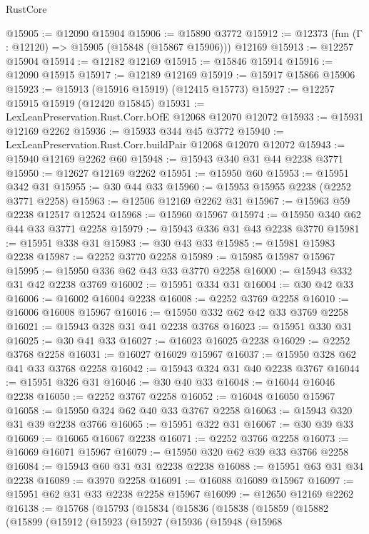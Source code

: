 \begin{lexlean}{RustCore}
\begin{coremodule}
@15905 := @12090 @15904
@15906 := @15890 @3772
@15912 := @12373 (fun (Γ : @12120) => @15905 (@15848 (@15867 @15906))) @12169
@15913 := @12257 @15904
@15914 := @12182 @12169
@15915 := @15846 @15914
@15916 := @12090 @15915
@15917 := @12189 @12169
@15919 := @15917 @15866 @15906
@15923 := @15913 (@15916 @15919) (@12415 @15773)
@15927 := @12257 @15915 @15919 (@12420 @15845)
@15931 := LexLeanPreservation.Rust.Corr.bOfE @12068 @12070 @12072
@15933 := @15931 @12169 @2262
@15936 := @15933 @344 @45 @3772
@15940 := LexLeanPreservation.Rust.Corr.buildPair @12068 @12070 @12072
@15943 := @15940 @12169 @2262 @60
@15948 := @15943 @340 @31 @44 @2238 @3771
@15950 := @12627 @12169 @2262
@15951 := @15950 @60
@15953 := @15951 @342 @31
@15955 := @30 @44 @33
@15960 := @15953 @15955 @2238 (@2252 @3771 @2258)
@15963 := @12506 @12169 @2262 @31
@15967 := @15963 @59 @2238 @12517 @12524
@15968 := @15960 @15967
@15974 := @15950 @340 @62 @44 @33 @3771 @2258
@15979 := @15943 @336 @31 @43 @2238 @3770
@15981 := @15951 @338 @31
@15983 := @30 @43 @33
@15985 := @15981 @15983 @2238
@15987 := @2252 @3770 @2258
@15989 := @15985 @15987 @15967
@15995 := @15950 @336 @62 @43 @33 @3770 @2258
@16000 := @15943 @332 @31 @42 @2238 @3769
@16002 := @15951 @334 @31
@16004 := @30 @42 @33
@16006 := @16002 @16004 @2238
@16008 := @2252 @3769 @2258
@16010 := @16006 @16008 @15967
@16016 := @15950 @332 @62 @42 @33 @3769 @2258
@16021 := @15943 @328 @31 @41 @2238 @3768
@16023 := @15951 @330 @31
@16025 := @30 @41 @33
@16027 := @16023 @16025 @2238
@16029 := @2252 @3768 @2258
@16031 := @16027 @16029 @15967
@16037 := @15950 @328 @62 @41 @33 @3768 @2258
@16042 := @15943 @324 @31 @40 @2238 @3767
@16044 := @15951 @326 @31
@16046 := @30 @40 @33
@16048 := @16044 @16046 @2238
@16050 := @2252 @3767 @2258
@16052 := @16048 @16050 @15967
@16058 := @15950 @324 @62 @40 @33 @3767 @2258
@16063 := @15943 @320 @31 @39 @2238 @3766
@16065 := @15951 @322 @31
@16067 := @30 @39 @33
@16069 := @16065 @16067 @2238
@16071 := @2252 @3766 @2258
@16073 := @16069 @16071 @15967
@16079 := @15950 @320 @62 @39 @33 @3766 @2258
@16084 := @15943 @60 @31 @31 @2238 @2238
@16088 := @15951 @63 @31 @34 @2238
@16089 := @3970 @2258
@16091 := @16088 @16089 @15967
@16097 := @15951 @62 @31 @33 @2238 @2258 @15967
@16099 := @12650 @12169 @2262
@16138 := @15768
    (@15793
      (@15834
        (@15836
          (@15838
            (@15859
              (@15882
                (@15899
                  (@15912
                    (@15923
                      (@15927
                        (@15936
                          (@15948
                            (@15968

\end{coremodule}
\end{lexlean}
